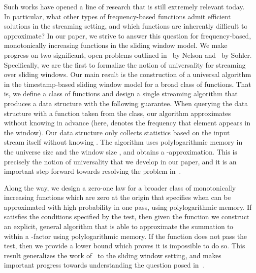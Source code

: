 \documentclass[11pt]{article}
\begin{document}
Such works have opened a line of research
that is still extremely relevant today.  In particular,
what other types of frequency-based functions
admit efficient solutions in the streaming setting, and which functions are inherently difficult to approximate?
In our paper, we strive to answer this question for frequency-based, monotonically increasing
functions in the sliding window model.  We make progress on two significant, open problems
outlined in~\cite{sub30} by Nelson and~\cite{sub20} by Sohler.  Specifically, we are the first
to formalize the notion of universality for streaming over sliding windows.  Our main result is
the construction of a universal algorithm in the timestamp-based sliding window model for a broad class of
functions.  That is, we define a class of functions and design a single
streaming algorithm that produces a data structure with the following guarantee.  When querying
the data structure with a function  taken from the class, our algorithm approximates 
without knowing  in advance (here,  denotes the frequency that element  appears in the window).
Our data structure only collects statistics based on
the input stream itself without knowing .  The algorithm uses polylogarithmic memory in the
universe size  and the window size , and obtains a -approximation.
This is precisely the notion of universality that we develop in our paper, and
it is an important step forward towards resolving the problem in~\cite{sub30}.

Along the way, we design a zero-one law for a broader class of
monotonically increasing functions  which are zero at the origin that specifies when
 can be approximated with high probability in one pass, using polylogarithmic memory.
If  satisfies the conditions specified by the test, then given the function  we construct an
explicit, general algorithm that is able to approximate the summation to within a -factor
using polylogarithmic memory.  If the function  does not pass the test, then we provide a lower
bound which proves it is impossible to do so.
This result generalizes the work of~\cite{BO10} to the sliding window setting,
and makes important progress towards understanding the question posed in~\cite{sub20}.
\end{document}
